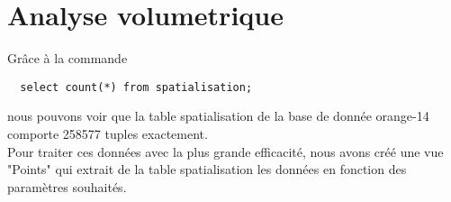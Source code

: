 \chapter{Analyse volumetrique}

Grâce à la commande \begin{verbatim}
  select count(*) from spatialisation;
\end{verbatim} nous pouvons voir que la table spatialisation de la base de donnée orange-14 comporte 258577 tuples exactement. \\
Pour traiter ces données avec la plus grande efficacité, nous avons créé une vue "Points" qui extrait de la table spatialisation les données en fonction des paramètres souhaités.
